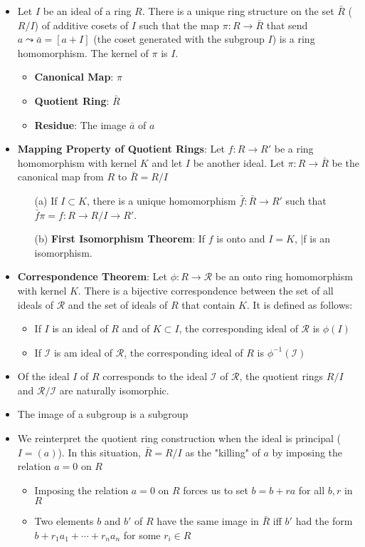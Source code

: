 \documentclass[12pt]{article}
\begin{document}
\begin{itemize}
  \item Let $I$ be an ideal of a ring $R$. There is a unique ring structure on the set $\bar{R}$ ($R/I$) of additive cosets of $I$ such that the map $\pi: R \to \bar{R}$ that send $a \leadsto \bar{a} = [a + I]$ (the coset generated with the subgroup $I$) is a ring homomorphism. The kernel of $\pi$ is $I$.
  \begin{itemize}
    \item \textbf{Canonical Map}: $\pi$
    \item \textbf{Quotient Ring}: $\bar{R}$
    \item \textbf{Residue}: The image $\bar{a}$ of $a$
  \end{itemize}
  \item \textbf{Mapping Property of Quotient Rings}: Let $f: R \to R'$ be a ring homomorphism with kernel $K$ and let $I$ be another ideal. Let $\pi: R \to \bar{R}$ be the canonical map from $R$ to $\bar{R} = R/I$
  \begin{enumerate}
    \item[(a)] If $I \subset K$, there is a unique homomorphism $\bar{f}: \bar{R} \to R'$ such that $\bar{f}\pi = f: R \to R/I \to R'$.
    \item[(b)] \textbf{First Isomorphism Theorem}: If $f$ is onto and $I = K$, \bar{f} is an isomorphism.
  \end{enumerate}
  \item \textbf{Correspondence Theorem}: Let $\phi: R \to \mathcal{R}$ be an onto ring homomorphism with kernel $K$. There is a bijective correspondence between the set of all ideals of $\mathcal{R}$ and the set of ideals of $R$ that contain $K$. It is defined as follows:
  \begin{itemize}
    \item If $I$ is an ideal of $R$ and of $K \subset I$, the corresponding ideal of $\mathcal{R}$ is $\phi(I)$
    \item If $\mathcal{I}$ is am ideal of $\mathcal{R}$, the corresponding ideal of $R$ is $\phi^{-1}(\mathcal{I})$
  \end{itemize}
  \item Of the ideal $I$ of $R$ corresponds to the ideal $\mathcal{I}$ of $\mathcal{R}$, the quotient rings $R/I$ and $\mathcal{R/I}$ are naturally isomorphic.
  \item The image of a subgroup is a subgroup
  \item We reinterpret the quotient ring construction when the ideal is principal ($I = (a)$). In this situation, $\bar{R} = R/I$ as the "killing" of $a$ by imposing the relation $a = 0$ on $R$
  \begin{itemize}
    \item Imposing the relation $a = 0$ on $R$ forces us to set $b = b + ra$ for all $b, r$ in $R$
    \item Two elements $b$ and $b'$ of $R$ have the same image in $\bar{R}$ iff $b'$ had the form $b + r_1a_1 + \cdots + r_na_n$ for some $r_i \in R$
  \end{itemize}
\end{itemize}
\end{document}
